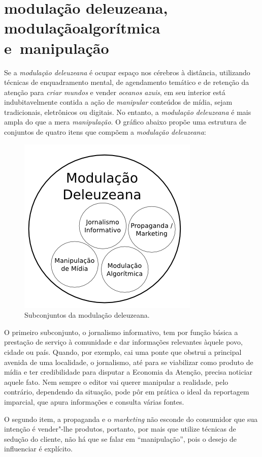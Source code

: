 \section{modulação deleuzeana, modulação\break algorítmica e~manipulação}

Se a \emph{modulação deleuzeana} é ocupar espaço nos cérebros à
distância, utilizando técnicas de enquadramento mental, de agendamento
temático e de retenção da atenção para \emph{criar mundos} e vender
\emph{oceanos azuis}, em seu interior está indubitavelmente contida a
ação de \emph{manipular} conteúdos de mídia, sejam tradicionais,
eletrônicos ou digitais. No entanto, a \emph{modulação deleuzeana} é
mais ampla do que a mera \emph{manipulação}. O gráfico abaixo propõe uma
estrutura de conjuntos de quatro itens que compõem a \emph{modulação
deleuzeana}: \enlargethispage{\baselineskip}

\begin{figure}[!ht]
\centering
\includegraphics[width=.4\textwidth]{./imgs/grafico2.png}
\caption{\formular\footnotesize{Subconjuntos da modulação deleuzeana.}}
\end{figure}

O primeiro subconjunto, o jornalismo informativo, tem por função básica
a prestação de serviço à comunidade e dar informações relevantes àquele
povo, cidade ou país. Quando, por exemplo, cai uma ponte que obstrui a
principal avenida de uma localidade, o jornalismo, até para se
viabilizar como produto de mídia e ter credibilidade para disputar a
Economia da Atenção, precisa noticiar aquele fato. Nem sempre o editor
vai querer manipular a realidade, pelo contrário, dependendo da
situação, pode pôr em prática o ideal da reportagem imparcial, que apura
informações e consulta várias fontes.

O segundo item, a propaganda e o \emph{marketing} não esconde do
consumidor que sua intenção é vender"-lhe produtos, portanto, por mais
que utilize técnicas de sedução do cliente, não há que se falar em
``manipulação'', pois o desejo de influenciar é explícito.

